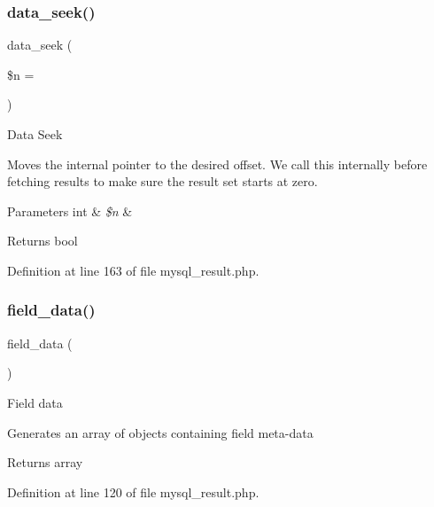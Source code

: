 \subsubsection{\texorpdfstring{data\_seek()}{data\_seek()}}
{\footnotesize\ttfamily data\+\_\+seek (\begin{DoxyParamCaption}\item[{}]{\$n = {} }\end{DoxyParamCaption})}

Data Seek

Moves the internal pointer to the desired offset. We call this internally before fetching results to make sure the result set starts at zero.


\begin{DoxyParams}[1]{Parameters}
int & {\em \$n} & \\
\hline
\end{DoxyParams}
\begin{DoxyReturn}{Returns}
bool 
\end{DoxyReturn}


Definition at line 163 of file mysql\+\_\+result.\+php.

\mbox{\label{class_c_i___d_b__mysql__result_a84bffd65e53902ade1591716749a33e3}} 
\subsubsection{\texorpdfstring{field\_data()}{field\_data()}}
{\footnotesize\ttfamily field\+\_\+data (\begin{DoxyParamCaption}{ }\end{DoxyParamCaption})}

Field data

Generates an array of objects containing field meta-\/data

\begin{DoxyReturn}{Returns}
array 
\end{DoxyReturn}


Definition at line 120 of file mysql\+\_\+result.\+php.

\mbox{\label{class_c_i___d_b__mysql__result_aad2d98d6beb3d6095405356c6107b473}} 
